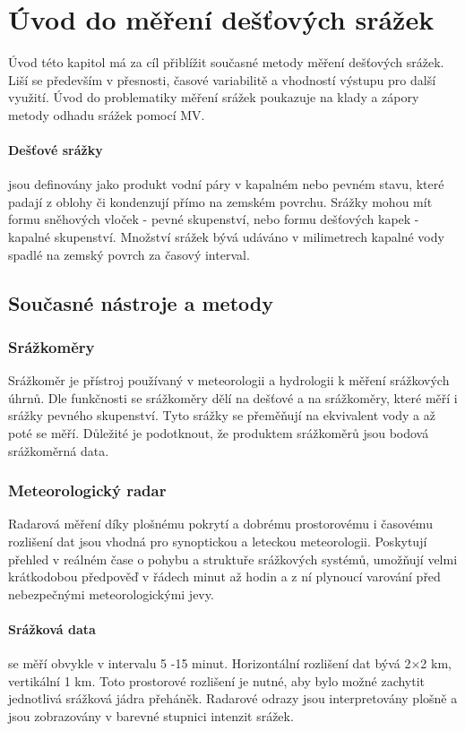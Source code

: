 \documentclass[a4paper,12pt,oneside]{report}
\begin{document}
\section{Úvod do měření dešťových srážek}
Úvod této kapitol má za cíl přiblížit současné metody měření dešťových srážek. Liší se především v přesnosti, časové variabilitě a vhodností výstupu pro další využití. Úvod do problematiky měření srážek poukazuje na klady a zápory metody odhadu srážek pomocí MV.


\paragraph*{Dešťové srážky}jsou definovány jako produkt vodní páry v kapalném nebo pevném stavu, které padají z oblohy či kondenzují přímo na zemském povrchu. Srážky mohou mít formu sněhových vloček - pevné skupenství, nebo formu dešťových kapek - kapalné skupenství. Množství srážek bývá udáváno v milimetrech kapalné vody spadlé na zemský povrch za časový interval.\cite{wmo} 

\subsection{Současné nástroje a metody }
\label{subsec:11}

\subsubsection{Srážkoměry}
Srážkoměr je přístroj používaný v meteorologii a hydrologii k měření srážkových úhrnů. Dle funkčnosti se srážkoměry dělí na dešťové a na srážkoměry, které měří i srážky pevného skupenství. Tyto srážky se přeměňují na ekvivalent vody a až poté se měří. Důležité je podotknout, že produktem srážkoměrů jsou bodová srážkoměrná data.

\subsubsection{Meteorologický radar}
Radarová měření díky plošnému pokrytí a dobrému prostorovému i časovému rozlišení dat jsou vhodná pro synoptickou a leteckou meteorologii. Poskytují přehled v reálném čase o pohybu a struktuře srážkových systémů, umožňují velmi krátkodobou předpověď v řádech minut až hodin a z ní plynoucí varování před nebezpečnými meteorologickými jevy.\cite{radar_chmu}

\paragraph*{Srážková data} se měří obvykle v intervalu 5 -15 minut. Horizontální rozlišení dat bývá 2×2 km, vertikální 1 km. Toto prostorové rozlišení je nutné, aby bylo možné zachytit jednotlivá srážková jádra přeháněk. Radarové odrazy jsou interpretovány plošně a jsou zobrazovány v barevné stupnici intenzit srážek.
\end{document}
